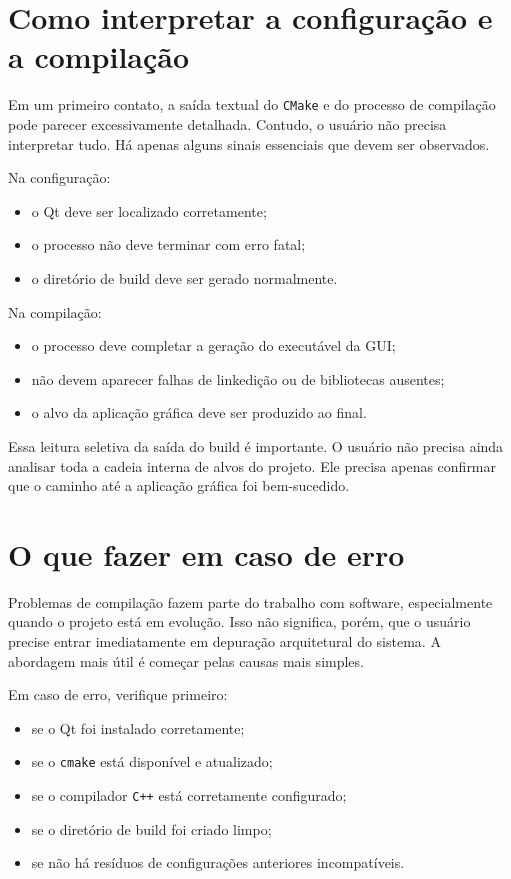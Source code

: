 \section{Como interpretar a configuração e a compilação}
\label{sec:cap2_como_interpretar_configuracao_compilacao}

Em um primeiro contato, a saída textual do \texttt{CMake} e do processo de compilação pode parecer excessivamente detalhada. Contudo, o usuário não precisa interpretar tudo. Há apenas alguns sinais essenciais que devem ser observados.

Na configuração:
\begin{itemize}
    \item o Qt deve ser localizado corretamente;
    \item o processo não deve terminar com erro fatal;
    \item o diretório de build deve ser gerado normalmente.
\end{itemize}

Na compilação:
\begin{itemize}
    \item o processo deve completar a geração do executável da GUI;
    \item não devem aparecer falhas de linkedição ou de bibliotecas ausentes;
    \item o alvo da aplicação gráfica deve ser produzido ao final.
\end{itemize}

Essa leitura seletiva da saída do build é importante. O usuário não precisa ainda analisar toda a cadeia interna de alvos do projeto. Ele precisa apenas confirmar que o caminho até a aplicação gráfica foi bem-sucedido.

\section{O que fazer em caso de erro}
\label{sec:cap2_o_que_fazer_em_caso_de_erro}

Problemas de compilação fazem parte do trabalho com software, especialmente quando o projeto está em evolução. Isso não significa, porém, que o usuário precise entrar imediatamente em depuração arquitetural do sistema. A abordagem mais útil é começar pelas causas mais simples.

Em caso de erro, verifique primeiro:
\begin{itemize}
    \item se o Qt foi instalado corretamente;
    \item se o \texttt{cmake} está disponível e atualizado;
    \item se o compilador \texttt{C++} está corretamente configurado;
    \item se o diretório de build foi criado limpo;
    \item se não há resíduos de configurações anteriores incompatíveis.
\end{itemize}

